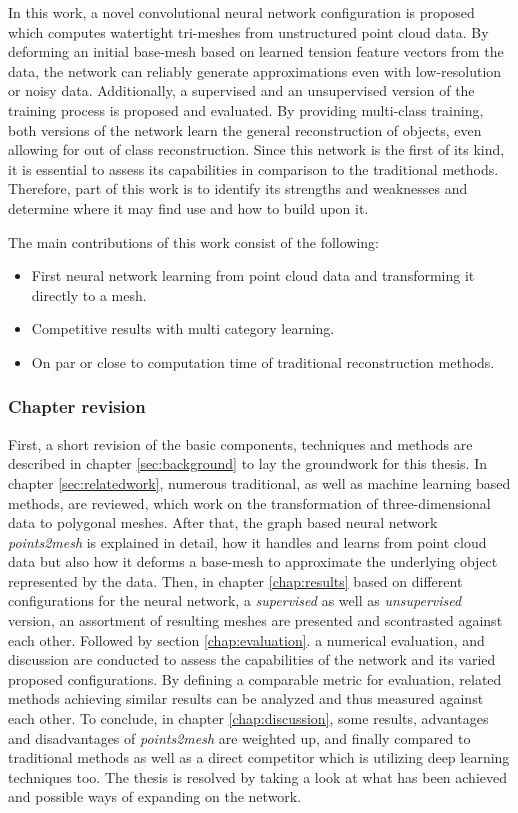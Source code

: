   In this work, a novel convolutional neural network configuration is proposed which computes watertight tri-meshes from unstructured point cloud data.
  By deforming an initial base-mesh based on learned tension feature vectors from the data, the network can reliably generate approximations
  even with low-resolution or noisy data. Additionally, a supervised and an unsupervised version of the training process is proposed and evaluated. 
  By providing multi-class training, both versions of the network learn the general reconstruction of objects, even allowing for out of class reconstruction.
  Since this network is the first of its kind, it is essential to assess its capabilities in comparison to the traditional methods. 
  Therefore, part of this work is to identify its strengths and weaknesses and determine where it may find use and how to build upon it.

  The main contributions of this work consist of the following:
  \begin{itemize}
    \item First neural network learning from point cloud data and transforming it directly to a mesh.
    \item Competitive results with multi category learning.
    \item On par or close to computation time of traditional reconstruction methods.
  \end{itemize}

  \subsubsection*{Chapter revision}
  First, a short revision of the basic components, techniques and methods are described in chapter \ref{sec:background} to lay the groundwork for this thesis. In chapter \ref{sec:relatedwork}, 
  numerous traditional, as well as machine learning based methods, are reviewed, which work on the transformation of three-dimensional data to polygonal
  meshes.
  After that, the graph based neural network \emph{points2mesh} is explained in detail, how it handles and learns from point cloud data but also how
  it deforms a base-mesh to approximate the underlying object represented by the data.
  Then, in chapter \ref{chap:results} based on different configurations for the neural network, a \emph{supervised} as well as \emph{unsupervised} version,
  an assortment of resulting meshes are presented and scontrasted against each other.
  Followed by section \ref{chap:evaluation}. a numerical evaluation, and discussion are conducted to assess the capabilities of the network and its 
  varied proposed configurations. By defining a comparable metric for evaluation, related methods achieving similar results can be analyzed and thus 
  measured against each other. To conclude, in chapter \ref{chap:discussion}, some results, advantages and disadvantages of \emph{points2mesh} 
  are weighted up, and finally compared to traditional methods as well as a direct competitor which is utilizing deep learning techniques too.
  The thesis is resolved by taking a look at what has been achieved and possible ways of expanding on the network.
